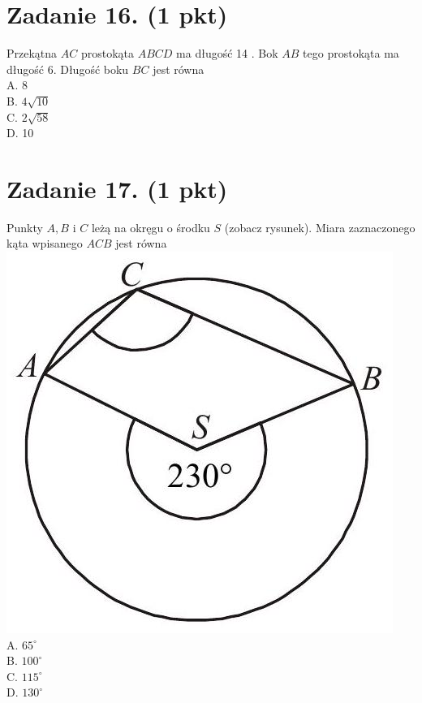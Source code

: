 \documentclass[10pt]{article}
\begin{document}
\section*{Zadanie 16. (1 pkt)}
Przekątna \(A C\) prostokąta \(A B C D\) ma długość 14 . Bok \(A B\) tego prostokąta ma długość 6. Długość boku \(B C\) jest równa\\
A. 8\\
B. \(4 \sqrt{10}\)\\
C. \(2 \sqrt{58}\)\\
D. 10

\section*{Zadanie 17. (1 pkt)}
Punkty \(A, B\) i \(C\) leżą na okręgu o środku \(S\) (zobacz rysunek). Miara zaznaczonego kąta wpisanego \(A C B\) jest równa\\
\includegraphics[max width=\textwidth, center]{2024_11_21_6a8be49478f78d0689cfg-06}\\
A. \(65^{\circ}\)\\
B. \(100^{\circ}\)\\
C. \(115^{\circ}\)\\
D. \(130^{\circ}\)
\end{document}
